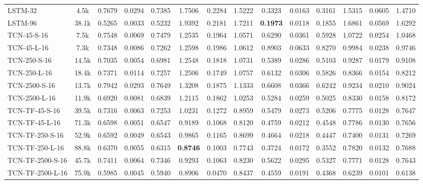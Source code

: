 \begin{table*}[h]
{\begin{tabular}{l c >{\columncolor{gray!20}}ccc >{\columncolor{gray!20}}ccc >{\columncolor{gray!20}}ccc >{\columncolor{gray!20}}ccc}
            \hline
            LSTM-32 & 4.5k & 0.7679 & 0.0294 & 0.7385 & 1.7506 & 0.2284 & 1.5222 & 0.3323 & 0.0163 & 0.3161 & 1.5315 & 0.0605 & 1.4710 \\
            LSTM-96 & 38.1k & 0.5265 & 0.0033 & 0.5232 & 1.9392 & 0.2181 & 1.7211 & \textbf{0.1973} & 0.0118 & 0.1855 & 1.6861 & 0.0569 & 1.6292 \\
            \hline
            TCN-45-S-16 & 7.5k & 0.7548 & 0.0069 & 0.7479 & 1.2535 & 0.1964 & 1.0571 & 0.6290 & 0.0361 & 0.5928 & 1.0722 & 0.0254 & 1.0468 \\
            TCN-45-L-16 & 7.3k & 0.7348 & 0.0086 & 0.7262 & 1.2598 & 0.1986 & 1.0612 & 0.8903 & 0.0633 & 0.8270 & 0.9984 & 0.0238 & 0.9746 \\
            TCN-250-S-16 & 14.5k & 0.7035 & 0.0054 & 0.6981 & 1.2548 & 0.1818 & 1.0731 & 0.5389 & 0.0286 & 0.5103 & 0.9287 & 0.0179 & 0.9108 \\
            TCN-250-L-16 & 18.4k & 0.7371 & 0.0114 & 0.7257 & 1.2506 & 0.1749 & 1.0757 & 0.6132 & 0.0306 & 0.5826 & 0.8366 & 0.0154 & 0.8212 \\
            TCN-2500-S-16 & 13.7k & 0.7942 & 0.0293 & 0.7649 & 1.3208 & 0.1875 & 1.1333 & 0.6608 & 0.0366 & 0.6242 & 0.9234 & 0.0210 & 0.9024 \\
            TCN-2500-L-16 & 11.9k & 0.6920 & 0.0081 & 0.6839 & 1.2115 & 0.1862 & 1.0253 & 0.5284 & 0.0259 & 0.5025 & 0.8330 & 0.0158 & 0.8172 \\
            \hline
            TCN-TF-45-S-16 & 39.5k & 0.7316 & 0.0063 & 0.7253 & 1.0231 & 0.1272 & 0.8959 & 0.5479 & 0.0273 & 0.5206 & 0.7775 & 0.0128 & 0.7647 \\
            TCN-TF-45-L-16 & 71.3k & 0.6598 & 0.0051 & 0.6547 & 0.9189 & 0.1068 & 0.8120 & 0.4759 & 0.0212 & 0.4548 & 0.7786 & 0.0130 & 0.7656 \\
            TCN-TF-250-S-16 & 52.9k & 0.6592 & 0.0049 & 0.6543 & 0.9865 & 0.1165 & 0.8699 & 0.4664 & 0.0218 & 0.4447 & 0.7400 & 0.0131 & 0.7269 \\
            TCN-TF-250-L-16 & 88.8k & 0.6370 & 0.0055 & 0.6315 & \textbf{0.8746} & 0.1003 & 0.7743 & 0.3724 & 0.0172 & 0.3552 & 0.7820 & 0.0132 & 0.7688 \\
            TCN-TF-2500-S-16 & 45.7k & 0.7411 & 0.0064 & 0.7346 & 0.9293 & 0.1063 & 0.8230 & 0.5622 & 0.0295 & 0.5327 & 0.7771 & 0.0128 & 0.7643 \\
            TCN-TF-2500-L-16 & 75.9k & 0.5985 & 0.0045 & 0.5940 & 0.8906 & 0.0470 & 0.8437 & 0.4559 & 0.0191 & 0.4368 & 0.6239 & 0.0101 & 0.6138 \\

\end{tabular}}
\end{table*}
